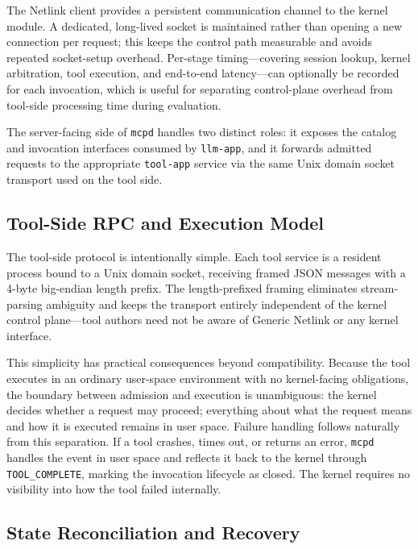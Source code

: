 The Netlink client provides a persistent communication channel to the kernel module.
A dedicated, long-lived socket is maintained rather than opening a new connection per request; this keeps the control path measurable and avoids repeated socket-setup overhead.
Per-stage timing---covering session lookup, kernel arbitration, tool execution, and end-to-end latency---can optionally be recorded for each invocation, which is useful for separating control-plane overhead from tool-side processing time during evaluation.

The server-facing side of \texttt{mcpd} handles two distinct roles: it exposes the catalog and invocation interfaces consumed by \texttt{llm-app}, and it forwards admitted requests to the appropriate \texttt{tool-app} service via the same Unix domain socket transport used on the tool side.



\subsection{Tool-Side RPC and Execution Model}

The tool-side protocol is intentionally simple.
Each tool service is a resident process bound to a Unix domain socket, receiving framed JSON messages with a 4-byte big-endian length prefix.
The length-prefixed framing eliminates stream-parsing ambiguity and keeps the transport entirely independent of the kernel control plane---tool authors need not be aware of Generic Netlink or any kernel interface.

This simplicity has practical consequences beyond compatibility.
Because the tool executes in an ordinary user-space environment with no kernel-facing obligations, the boundary between admission and execution is unambiguous: the kernel decides whether a request may proceed; everything about what the request means and how it is executed remains in user space.
Failure handling follows naturally from this separation.
If a tool crashes, times out, or returns an error, \texttt{mcpd} handles the event in user space and reflects it back to the kernel through \texttt{TOOL\_COMPLETE}, marking the invocation lifecycle as closed.
The kernel requires no visibility into how the tool failed internally.



\subsection{State Reconciliation and Recovery}

